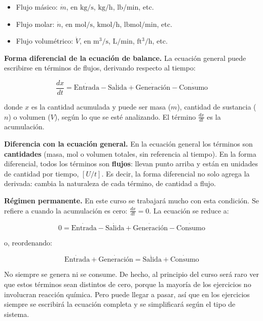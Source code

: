 \begin{itemize}
    \item Flujo másico: $\dot{m}$, en $\mathrm{kg/s}$,
    $\mathrm{kg/h}$, $\mathrm{lb/min}$, etc.
    \item Flujo molar: $\dot{n}$, en $\mathrm{mol/s}$,
    $\mathrm{kmol/h}$, $\mathrm{lbmol/min}$, etc.
    \item Flujo volumétrico: $\dot{V}$, en $\mathrm{m^3/s}$,
    $\mathrm{L/min}$, $\mathrm{ft^3/h}$, etc.
\end{itemize}

\textbf{Forma diferencial de la ecuación de balance.} La ecuación
general puede escribirse en términos de flujos, derivando respecto al
tiempo:

\[
\frac{dx}{dt} = \dot{\text{Entrada}} - \dot{\text{Salida}}
+ \dot{\text{Generación}} - \dot{\text{Consumo}}
\]

donde $x$ es la cantidad acumulada y puede ser masa ($m$), cantidad
de sustancia ($n$) o volumen ($V$), según lo que se esté analizando.
El término $\frac{dx}{dt}$ es la acumulación.

\textbf{Diferencia con la ecuación general.} En la ecuación general
los términos son \textbf{cantidades} (masa, mol o volumen totales,
sin referencia al tiempo). En la forma diferencial, todos los
términos son \textbf{flujos}: llevan punto arriba y están en unidades
de cantidad por tiempo, $[U/t]$. Es decir, la forma diferencial no
solo agrega la derivada: cambia la naturaleza de cada término, de
cantidad a flujo.

\textbf{Régimen permanente.} En este curso se trabajará mucho con
esta condición. Se refiere a cuando la acumulación es cero:
$\frac{dx}{dt} = 0$. La ecuación se reduce a:

\[
0 = \dot{\text{Entrada}} - \dot{\text{Salida}}
+ \dot{\text{Generación}} - \dot{\text{Consumo}}
\]

o, reordenando:

\[
\dot{\text{Entrada}} + \dot{\text{Generación}}
= \dot{\text{Salida}} + \dot{\text{Consumo}}
\]

\begin{notaimportante}
No siempre se genera ni se consume. De hecho, al principio del curso
será raro ver que estos términos sean distintos de cero, porque la
mayoría de los ejercicios no involucran reacción química. Pero puede
llegar a pasar, así que en los ejercicios siempre se escribirá la
ecuación completa y se simplificará según el tipo de sistema.
\end{notaimportante}

